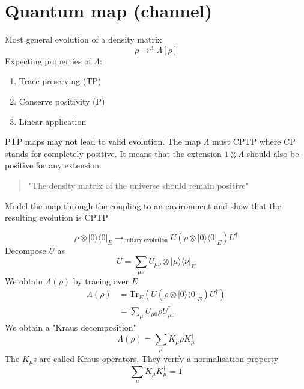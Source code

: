 \documentclass[a4paper]{book}
\theoremstyle{definition}
\theoremstyle{remark}
\begin{document}
\section{Quantum map (channel)}
Most general evolution of a density matrix 
\begin{equation}
    \rho \rightarrow^\Lambda \Lambda[\rho]
\end{equation}
Expecting properties of $\Lambda$:
\begin{enumerate}
    \item Trace preserving (TP)
    \item Conserve positivity (P)
    \item Linear application 
\end{enumerate}

PTP maps may not lead to valid evolution. The map $\Lambda$ must CPTP where CP stands for completely positive. It means that the extension $1\otimes \Lambda$ should also be positive for any extension. 
\begin{quote}
    "The density matrix of the universe should remain positive"
\end{quote}
Model the map through the coupling to an environment and show that the resulting evolution is CPTP 

\begin{equation}
    \rho \otimes |0\rangle \langle 0|_E \rightarrow_{\text{unitary evolution}} U(\rho \otimes |0\rangle \langle 0|_E)U^\dagger
\end{equation}
Decompose $U$ as 
\begin{equation}
    U = \sum_{\mu\nu} U_{\mu\nu} \otimes |\mu \rangle \langle \nu|_E
\end{equation}
We obtain $\Lambda(\rho)$ by tracing over $E$
\begin{equation}
    \begin{aligned}
        \Lambda(\rho) &= \text{Tr}_E(U(\rho \otimes |0\rangle \langle 0|_E)U^\dagger) \\
        &= \sum_\mu U_{\mu 0} \rho U^\dagger_{\mu 0}
    \end{aligned}
\end{equation}
We obtain a "Kraus decomposition" 
\begin{equation}
    \Lambda(\rho) = \sum_\mu K_\mu \rho K^\dagger_\mu
\end{equation}
The $K_\mu$s are called Kraus operators. They verify a normalisation property 
\begin{equation}
    \sum_\mu K_\mu K^\dagger_\mu = 1
\end{equation}
\end{document}
